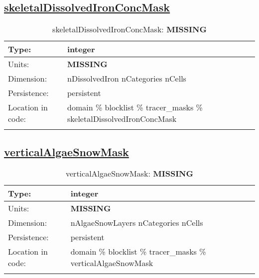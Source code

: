\subsection[skeletalDissolvedIronConcMask]{\hyperref[sec:var_tab_tracer_masks]{skeletalDissolvedIronConcMask}}
\label{subsec:var_sec_tracer_masks_skeletalDissolvedIronConcMask}
\begin{center}
\begin{longtable}{| p{2.0in} | p{4.0in} |}
        \hline 
        Type: & integer \\
        \hline 
        Units: & {\bf \color{red} MISSING} \\
        \hline 
        Dimension: & nDissolvedIron nCategories nCells \\
        \hline 
        Persistence: & persistent \\
        \hline 
         Location in code: & domain \% blocklist \% tracer\_masks \% skeletalDissolvedIronConcMask \\
         \hline 
    \caption{skeletalDissolvedIronConcMask: {\bf \color{red} MISSING}}
\end{longtable}
\end{center}
\subsection[verticalAlgaeSnowMask]{\hyperref[sec:var_tab_tracer_masks]{verticalAlgaeSnowMask}}
\label{subsec:var_sec_tracer_masks_verticalAlgaeSnowMask}
\begin{center}
\begin{longtable}{| p{2.0in} | p{4.0in} |}
        \hline 
        Type: & integer \\
        \hline 
        Units: & {\bf \color{red} MISSING} \\
        \hline 
        Dimension: & nAlgaeSnowLayers nCategories nCells \\
        \hline 
        Persistence: & persistent \\
        \hline 
         Location in code: & domain \% blocklist \% tracer\_masks \% verticalAlgaeSnowMask \\
         \hline 
    \caption{verticalAlgaeSnowMask: {\bf \color{red} MISSING}}
\end{longtable}
\end{center}
